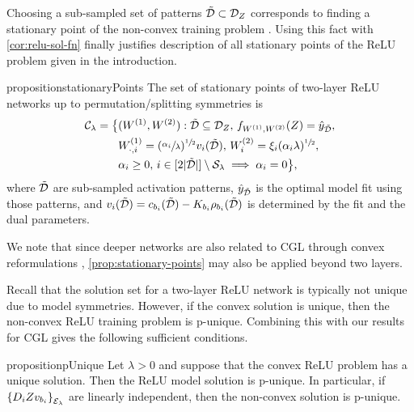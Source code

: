 Choosing a sub-sampled set of patterns
\( \tilde {\mathcal{D}} \subset \mathcal{D}_Z \) corresponds to finding a stationary
point of the non-convex training problem \citep{wang2022hidden}.
Using this fact with \cref{cor:relu-sol-fn} finally justifies
description of all stationary points of the ReLU
problem given in the introduction.
\begin{restatable}{proposition}{stationaryPoints}\label{prop:stationary-points}
    The set of stationary points of two-layer ReLU networks up to
    permutation/splitting symmetries is
    \begin{equation*}
        \begin{aligned}
            \mathcal{C}_\lambda = \big\{
             & (W^{(1)},  W^{(2)}) : \tilde {\mathcal{D}}  \subseteq  \mathcal{D}_Z,
            \, f_{W^{(1)}, W^{(2)}}(Z)  =  \hat y_{\tilde {\mathcal{D}}},                                         \\
             & W^{(1)}_{\cdot, i} = (\sfrac{\alpha_{i}}{\lambda})^{\sfrac{1}{2}} v_i(\tilde {\mathcal{D}}), \,
            W^{(2)}_{i} = \xi_i(\alpha_i \lambda)^{\sfrac{1}{2}},                                         \\
             & \alpha_i \geq 0, \, i \in [2 |\tilde {\mathcal{D}}|] \setminus \mathcal{S}_\lambda \implies \alpha_i = 0
            \big\},
        \end{aligned}
    \end{equation*}
    where \( \tilde {\mathcal{D}} \) are sub-sampled activation patterns,
    \( \hat y_{\tilde {\mathcal{D}}} \) is the optimal model fit using
    those patterns, and
    \( v_i(\tilde {\mathcal{D}}) = c_{b_i}(\tilde {\mathcal{D}}) - K_{{b_i}} \rho_{{b_i}}(\tilde {\mathcal{D}}) \)
    is determined by the fit and the dual parameters.
\end{restatable}

We note that since deeper networks are also related
to CGL through convex reformulations \citep{ergen2021beyond},
\cref{prop:stationary-points} may also be applied beyond two layers.

Recall that the solution set for a two-layer ReLU network
is typically not unique due to model symmetries.
However, if the convex solution is unique, then
the non-convex ReLU training problem is p-unique.
Combining this with our results for CGL
gives the following sufficient conditions.

\begin{restatable}{proposition}{pUnique}\label{prop:p-unique}
    Let \( \lambda > 0 \)
    and suppose that the convex ReLU problem
    has a unique solution.
    Then the ReLU model solution is p-unique.
    In particular,
    if \( \left\{D_i Z v_{b_i}\right\}_{\mathcal{E}_{\lambda}} \) are linearly independent,
    then the non-convex solution is p-unique.
\end{restatable}


